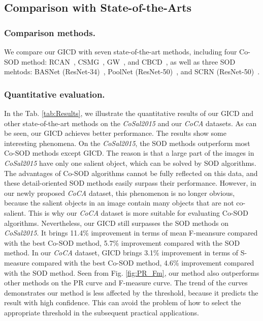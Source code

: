 \documentclass[runningheads,orivec]{llncs}
\newcommand{\tabref}[1]{Tab. \ref{#1}}
\newcommand{\figref}[1]{Fig. \ref{#1}}
\begin{document}
\subsection{Comparison with State-of-the-Arts}
\subsubsection{Comparison  methods.}
We compare our GICD with seven state-of-the-art methods, including four Co-SOD method: RCAN~\cite{li2019detecting},
CSMG~\cite{zhang2019CSMG}, GW~\cite{wei2017gw}, and CBCD~\cite{fu2013cluster},
as well as three SOD mehtods: BASNet (ResNet-34)~\cite{qin2019basnet}, PoolNet (ResNet-50)~\cite{liu2019poolnet}, and SCRN (ResNet-50)~\cite{wu2019SCRN}.




\subsubsection{Quantitative evaluation.}
In the \tabref{tab:Results},
we illustrate the quantitative results of our GICD and other state-of-the-art methods on the \textit{CoSal2015} and our \textit{CoCA} datasets.
As can be seen, 
our GICD achieves better performance.
The results show some interesting phenomena.
On the \textit{CoSal2015}, the SOD methods outperform most Co-SOD methods except GICD.
The reason is that a large part of the images in \textit{CoSal2015} have only one salient object, 
which can be solved by SOD algorithms.
The advantages of Co-SOD algorithms cannot be fully reflected on this data, 
and these detail-oriented SOD methods easily surpass their performance.
However, in our newly proposed \textit{CoCA} dataset, 
this phenomenon is no longer obvious, because the salient objects in an image contain many objects that are not co-salient.
This is why our \textit{CoCA} dataset is more suitable for evaluating Co-SOD algorithms.
Nevertheless, our GICD still surpasses the SOD methods on \textit{CoSal2015}.
It brings 11.4\% improvement in terms of mean F-meansure compared with the best Co-SOD method,
5.7\% improvement compared with the SOD method.
In our \textit{CoCA} dataset,
GICD brings 3.1\% improvement in terms of S-measure compared with the best Co-SOD method,
4.6\% improvement compared with the SOD method.
Seen from \figref{fig:PR_Fm}, our method also outperforms other methods on the PR curve and F-measure curve. 
The trend of the curves demonstrates
our method is less affected by the threshold, because it predicts the result with high confidence.
This can avoid the problem of how to select the appropriate threshold in the subsequent practical applications.
\end{document}
